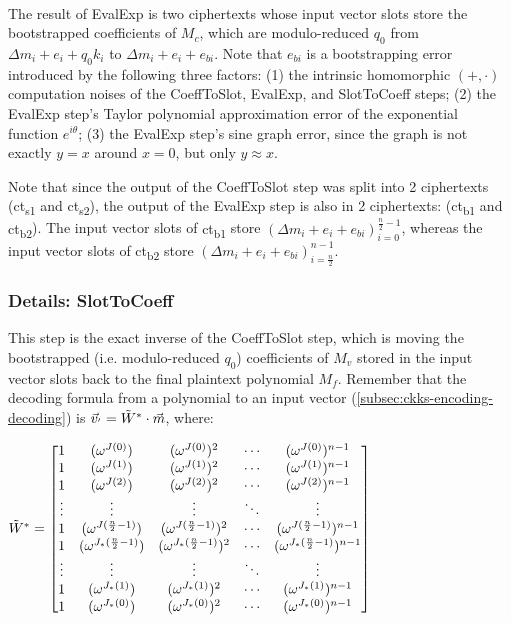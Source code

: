 $ $

The result of \textsf{EvalExp} is two ciphertexts whose input vector slots store the bootstrapped coefficients of $M_c$, which are modulo-reduced $q_0$ from $\Delta m_i + e_i + q_0k_i$ to $\Delta m_i + e_i + e_{bi}$. Note that $e_{bi}$ is a bootstrapping error introduced by the following three factors: (1) the intrinsic homomorphic $(+, \cdot)$ computation noises of the \textsf{CoeffToSlot}, \textsf{EvalExp}, and \textsf{SlotToCoeff} steps; (2) the \textsf{EvalExp} step's Taylor polynomial approximation error of the exponential function $e^{i\theta}$; (3) the \textsf{EvalExp} step's sine graph error, since the graph is not exactly $y=x$ around $x=0$, but only $y \approx x$.

Note that since the output of the \textsf{CoeffToSlot} step was split into 2 ciphertexts (\textsf{ct\textsubscript{s1}} and \textsf{ct\textsubscript{s2}}), the output of the \textsf{EvalExp} step is also in 2 ciphertexts: (\textsf{ct\textsubscript{b1}} and \textsf{ct\textsubscript{b2}}). The input vector slots of \textsf{ct\textsubscript{b1}} store $(\Delta m_i + e_i + e_{bi})_{i=0}^{\frac{n}{2} - 1}$, whereas the input vector slots of \textsf{ct\textsubscript{b2}} store $(\Delta m_i + e_i + e_{bi})_{i=\frac{n}{2}}^{n - 1}$.


\subsubsection{Details: \textsf{SlotToCoeff}}
\label{subsubsec:ckks-bootstrapping-slottocoeff-details}

This step is the exact inverse of the \textsf{CoeffToSlot} step, which is moving the bootstrapped (i.e. modulo-reduced $q_0$) coefficients of $M_v$ stored in the input vector slots back to the final plaintext polynomial $M_f$. Remember that the decoding formula from a polynomial to an input vector (\autoref{subsec:ckks-encoding-decoding}) is $\vec{v}_{'} = \tilde W^* \cdot \vec{m}$, where:




$\tilde{W}^* = \begin{bmatrix}
1 & (\omega^{J(0)}) & (\omega^{J(0)})^2 & \cdots & (\omega^{J(0)})^{n-1}\\
1 & (\omega^{J(1)}) & (\omega^{J(1)})^2 & \cdots & (\omega^{J(1)})^{n-1}\\
1 & (\omega^{J(2)}) & (\omega^{J(2)})^2 & \cdots & (\omega^{J(2)})^{n-1}\\
\vdots & \vdots & \vdots & \ddots & \vdots \\
1 & (\omega^{J(\frac{n}{2}-1)}) & (\omega^{J(\frac{n}{2}-1)})^2 & \cdots & (\omega^{J(\frac{n}{2}-1)})^{n-1}\\
1 & (\omega^{J_*(\frac{n}{2}-1)}) & (\omega^{J_*(\frac{n}{2}-1)})^2 & \cdots & (\omega^{J_*(\frac{n}{2}-1)})^{n-1}\\
\vdots & \vdots & \vdots & \ddots & \vdots \\
1 & (\omega^{J_*(1)}) & (\omega^{J_*(1)})^2 & \cdots & (\omega^{J_*(1)})^{n-1}\\
1 & (\omega^{J_*(0)}) & (\omega^{J_*(0)})^2 & \cdots & (\omega^{J_*(0)})^{n-1}\\
\end{bmatrix}$

